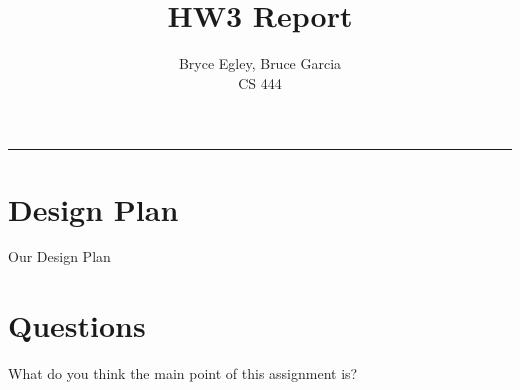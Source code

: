 \documentclass{article}
\newenvironment{question}[2][Question]{\begin{trivlist}
\item[\hskip \labelsep {\bfseries #1}\hskip \labelsep {\bfseries #2.}]}{\end{trivlist}}
\begin{document}

\title{HW3 Report} %
\author{Bryce Egley, Bruce Garcia\\CS 444} %

\maketitle
\hrule


%
%

\section*{Design Plan}
Our Design Plan
\newline


\section*{Questions}

\begin{question}{1}
What do you think the main point of this assignment is?
\end{question}




\vspace{0.25in} %
\end{document}
